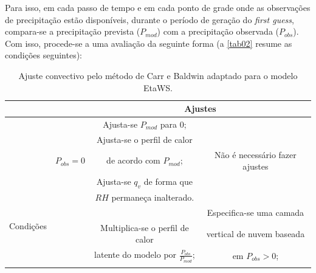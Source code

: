 Para isso, em cada passo de tempo e em cada ponto de grade onde as observações de precipitação estão disponíveis, durante o período de geração do \textit{first guess}, compara-se a precipitação prevista ($P_{mod}$) com a precipitação observada ($P_{obs}$). Com isso, procede-se a uma avaliação da seguinte forma (a \autoref{tab02} resume as condições seguintes):

\begin{table}[!hbp]
\caption{Ajuste convectivo pelo método de Carr e Baldwin adaptado para o \-mo\-de\-lo EtaWS.}
\label{tab02}
\centering
\begin{tabular}{|c|c|c|c|}
\cline{3-4} 
\multicolumn{1}{c}{} &  & \multicolumn{2}{c|}{Ajustes}\tabularnewline
\hline 
\begin{sideways}

\end{sideways} &  & Ajusta-se $P_{mod}$ para 0; & \tabularnewline
\begin{sideways}

\end{sideways} &  & Ajusta-se o perfil de calor & \tabularnewline
\begin{sideways}

\end{sideways} & $P_{obs}=0$ & de acordo com $P_{mod}$; & Não é necessário fazer ajustes\tabularnewline
\begin{sideways}

\end{sideways} &  & Ajusta-se $q_{v}$ de forma que & \tabularnewline
\begin{sideways}

\end{sideways} &  & $RH$ permaneça inalterado. & \tabularnewline
\cline{2-4} 
\multirow{2}{0pt}{\begin{sideways}Condições\end{sideways}}
\begin{sideways}

\end{sideways} &  &  & Especifica-se uma camada\tabularnewline
 
\begin{sideways}

\end{sideways} &  & Multiplica-se o perfil de calor & vertical de nuvem baseada\tabularnewline
\begin{sideways}

\end{sideways} &  & latente do modelo por $\frac{P_{obs}}{P_{mod}}$; & em $P_{obs}>0$;\tabularnewline
\begin{sideways}


\end{sideways}
\end{tabular}
\end{table}
